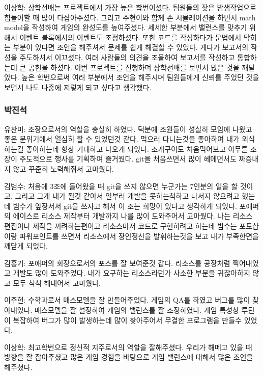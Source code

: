 \documentclass[10pt,oneside,a4paper,titlepage]{article}
\begin{document}
이상학: 상학선배는 프로젝트에서 가장 높은 학번이셨다. 팀원들의 잦은 밤샘작업으로 힘들어할 때 많이 다잡아주셨다. 그리고 주현이와 함께 손 시뮬레이션을 하면서 math model을 작성하여 게임의 완성도를 높여주셨다. 세세한 부분에서 밸런스를 맞추기 위해서 이벤트 블록에서의 이벤트도 조정하셨다. 또한 코드를 작성하다가 문법에서 막히는 부분이 있다면 조언을 해주셔서 문제를 쉽게 해결할 수 있었다. 게다가 보고서의 작성을 주도하셔서 이끄셨다. 여러 사람들의 의견을 조율하여 보고서를 작성하고 통합하는데 큰 공헌을 하셨다. 이번 프로젝트를 진행하며 상학선배를 보면서 많은 것을 깨달았다. 높은 학번으로써 여러 부분에서 조언을 해주시며 팀원들에게 신뢰를 주었던 것을 보면서 나도 나중에 저렇게 되고 싶다고 생각했다.


\subsubsection{박진석}

유찬미: 조장으로서의 역할을 충실히 하였다. 덕분에 조원들이 성실히 모임에 나왔고 좋은 분위기에서 열심히 할 수 있었던것 같다. 먹으러 다니는것을 좋아하여 내가 외식하는걸 좋아하는데 항상 기대하고 나오게 되었다. 조개구이도 처음먹어보고 아무튼 조장이 주도적으로 행사를 기획하여 즐거웠다. git을 처음쓰면서 많이 헤메면서도 짜증내지 않고 꾸준히 노력해줘서 고마웠다. 

김범수: 처음에 3조에 들어왔을 때 git을 쓰지 않으면 누군가는 7인분의 일을 할 것이고, 그리고 그게 내가 될것 같아서 일부러 개발을 못하는척하고 나서지 않으려고 했는데 범수가 앞장서서 git을 쓰자고 해서 이 조는 희망이 있다고 생각하게 되었다. 포애퍼의 에이스로 리소스 제작부터 개발까지 나를 많이 도와주어서 고마웠다. 나는 리소스 편집이나 제작을 꺼려하는편이고 리소스마저 코드로 구현하려고 하는데 범수는 포토샵이랑 파워포인트를 쓰면서 리소스에서 장인정신을 발휘하는것을 보고 내가 부족한면을 깨닫게 되었다. 

김홍기: 포애퍼의 회장으로서의 포스를 잘 보여준것 같다. 리소스를 공장처럼 찍어내었고 개발도 많이 도와주었다. 내가 요구하는 리소스라던가 사소한 부분을 귀찮아하지 않고 모두 척척 해내어서 고마웠다. 

이주현: 수학과로서 매스모델을 잘 만들어주었다. 게임의 QA를 하였고 버그를 많이 찾아내었다. 매스모델을 잘 설정하여 게임의 밸런스를 잘 조정하였다. 게임 특성상 루틴이 복잡하여 버그가 많이 발생하는데 많이 찾아주어서 무결한 프로그램을 만들수 있었다.

이상학: 최고학번으로 정신적 지주로서의 역할을 잘해주셨다. 우리가 해메고 있을 때 방향을 잘 잡아주셨고 많은 게임 경험을 바탕으로 게임 밸런스에 대해서 많은 조언을 해주셨다. 
\end{document}
